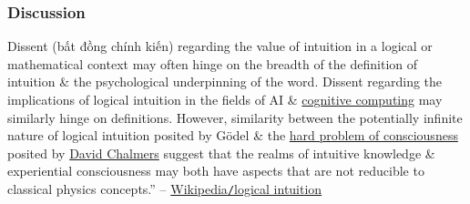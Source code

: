 \documentclass{article}
\begin{document}
\subsubsection{Discussion}
Dissent (bất đồng chính kiến) regarding the value of intuition in a logical or mathematical context may often hinge on the breadth of the definition of intuition \& the psychological underpinning of the word. Dissent regarding the implications of logical intuition in the fields of AI \& \href{https://en.wikipedia.org/wiki/Cognitive_computing}{cognitive computing} may similarly hinge on definitions. However, similarity between the potentially infinite nature of logical intuition posited by G\"odel \& the \href{https://en.wikipedia.org/wiki/Hard_problem_of_consciousness}{hard problem of consciousness} posited by \href{https://en.wikipedia.org/wiki/David_Chalmers}{\sc David Chalmers} suggest that the realms of intuitive knowledge \& experiential consciousness may both have aspects that are not reducible to classical physics concepts.'' -- \href{https://en.wikipedia.org/wiki/Logical_intuition}{Wikipedia{\tt/}logical intuition}

\end{document}
